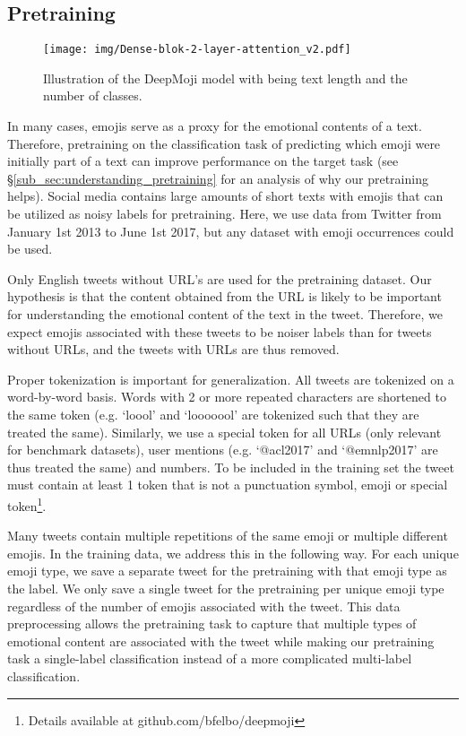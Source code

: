 \documentclass[11pt,a4paper]{article}
\begin{document}
\subsection{Pretraining}
\label{sub_sec:pretraining}

\begin{figure}[tp]
  \centering
  \texttt{[image: img/Dense-blok-2-layer-attention\_v2.pdf]}
  \caption{Illustration of the DeepMoji model with  being text length and  the number of classes.}
  \label{fig:lstm}
\end{figure}

In many cases, emojis serve as a proxy for the emotional contents of a text. Therefore, pretraining on the classification task of predicting which emoji were initially part of a text can improve performance on the target task (see \S\ref{sub_sec:understanding_pretraining} for an analysis of why our pretraining helps). Social media contains large amounts of short texts with emojis that can be utilized as noisy labels for pretraining. Here, we use data from Twitter from January 1st 2013 to June 1st 2017, but any dataset with emoji occurrences could be used.

Only English tweets without URL's are used for the pretraining dataset. Our hypothesis is that the content obtained from the URL is likely to be important for understanding the emotional content of the text in the tweet. Therefore, we expect emojis associated with these tweets to be noiser labels than for tweets without URLs, and the tweets with URLs are thus removed.

Proper tokenization is important for generalization. All tweets are tokenized on a word-by-word basis. Words with 2 or more repeated characters are shortened to the same token (e.g. `loool' and `looooool' are tokenized such that they are treated the same). Similarly, we use a special token for all URLs (only relevant for benchmark datasets), user mentions (e.g. `@acl2017' and `@emnlp2017' are thus treated the same) and numbers. To be included in the training set the tweet must contain at least 1 token that is not a punctuation symbol, emoji or special token\footnote{Details available at github.com/bfelbo/deepmoji}.

Many tweets contain multiple repetitions of the same emoji or multiple different emojis. In the training data, we address this in the following way. For each unique emoji type, we save a separate tweet for the pretraining with that emoji type as the label. We only save a single tweet for the pretraining per unique emoji type regardless of the number of emojis associated with the tweet. This data preprocessing allows the pretraining task to capture that multiple types of emotional content are associated with the tweet while making our pretraining task a single-label classification instead of a more complicated multi-label classification.
\end{document}

